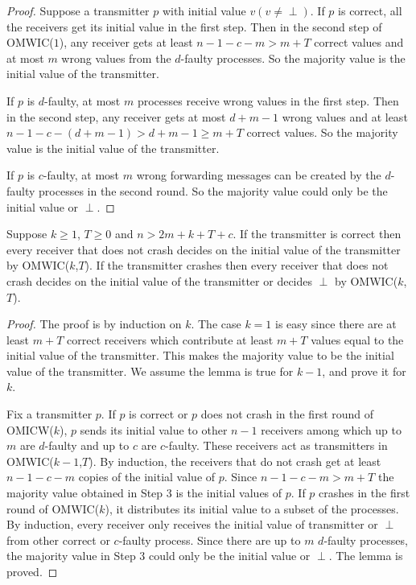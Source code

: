 \begin{proof}
  Suppose a transmitter $p$ with initial value $v ( v \neq \perp )$. If $p$ is
  correct, all the receivers get its initial value in the first step. Then in
  the second step of OMWIC($1$), any receiver gets at least $n-1-c-m>m+T$
  correct values and at most $m$ wrong values from the $d$-faulty processes.
  So the majority value is the initial value of the transmitter.
  
  If $p$ is $d$-faulty, at most $m$ processes receive wrong values in the
  first step. Then in the second step, any receiver gets at most $d+m-1$ wrong
  values and at least $n-1-c- ( d+m-1 ) >d+m-1 \geqslant m+T$ correct
  values. So the majority value is the initial value of the transmitter.
  
  If $p$ is $c$-faulty, at most $m$ wrong forwarding messages can be created
  by the $d$-faulty processes in the second round. So the majority value could
  only be the initial value or $\perp$.
\end{proof}

\begin{lemma}\label{crash:correct}
  Suppose $k \geqslant 1$, $T \geqslant 0$ and $n>2m+k+T+c$. If the
  transmitter is correct then every receiver that does not crash decides on
  the initial value of the transmitter by OMWIC($k$,$T$). If the transmitter
  crashes then every receiver that does not crash decides on the initial
  value of the transmitter or decides $\perp$ by OMWIC($k$,$T$).
\end{lemma}

\begin{proof}
  The proof is by induction on $k$. The case $k=1$ is easy since there are at
  least $m+T$ correct receivers which contribute at least $m+T$ values equal
  to the initial value of the transmitter. This makes the majority value to
  be the initial value of the transmitter. We assume the lemma is true for
  $k-1$, and prove it for $k$.
  
  Fix a transmitter $p$. If $p$ is correct or $p$ does not crash in the first
  round of OMICW($k$), $p$ sends its initial value to other $n-1$ receivers
  among which up to $m$ are $d$-faulty and up to $c$ are $c$-faulty. These
  receivers act as transmitters in OMWIC($k-1$,$T$). By induction,
  the receivers that do not crash get at least $n-1-c-m$ copies of the
  initial value of $p$. Since $n-1-c-m>m+T$ the majority value obtained in
  Step $3$ is the initial values of $p$. If $p$ crashes in the first round of
  OMWIC($k$), it distributes its initial value to a subset of the processes.
  By induction, every receiver only receives the initial value of
  transmitter or $\perp$ from other correct or $c$-faulty process. Since
  there are up to $m$ $d$-faulty processes, the majority value in Step $3$
  could only be the initial value or $\perp$. The lemma is proved.
\end{proof}

